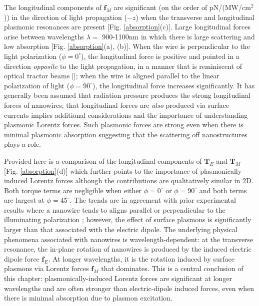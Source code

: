 The longitudinal components of $\mathbf{f}_M$ are significant (on the order of pN/(MW/cm$^2$)) in the direction of light propagation ($-z$) when the transverse and longitudinal plasmonic resonances are present [Fig. \ref{absorption}(c)]. Large longitudinal forces arise between wavelengths $\lambda=$ 900-1100nm in which there is large scattering and low absorption [Fig. \ref{absorption}(a), (b)].
When the wire is perpendicular to the light polarization ($\phi = 0^\circ$), the longitudinal force is positive and pointed in a direction {\it opposite} to the light propagation, in a manner that is reminiscent of optical tractor beams [\cite{Ruffner2012}]; when the wire is aligned parallel to the linear polarization of light ($\phi = 90^\circ$), the longitudinal force increases significantly. It has generally been assumed that radiation pressure produces the strong longitudinal forces of nanowires; that longitudinal forces are {\it also} produced via surface currents implies additional considerations and the importance of understanding plasmonic Lorentz forces.  Such plasmonic forces are strong even when there is minimal plasmonic absorption suggesting that the scattering off nanostructures plays a role.

Provided here is a comparison of the longitudinal components of $\mathbf{T}_E$ and $\mathbf{T}_M$ [Fig. \ref{absorption}(d)] which further points to the importance of plasmonically-induced Lorentz forces although the contributions are qualitatively similar in 2D.  Both torque terms are negligible when either $\phi = 0^\circ$ or $\phi = 90^\circ$ and both terms are largest at $\phi = 45^\circ$. The trends are in agreement with prior experimental results where a nanowire tends to aligns parallel or perpendicular to the illuminating polarization \cite{Tong}; however, the effect of surface plasmons is significantly larger than that associated with the electric dipole.  The underlying physical phenomena associated with nanowires is wavelength-dependent: at the transverse resonance, the in-plane rotation of nanowires is produced by the induced electric dipole force $\mathbf{f}_E$.  At longer wavelengths, it is the rotation induced by surface plasmons via Lorentz forces $\mathbf{f}_M$ that dominates.  This is a central conclusion of this chapter: plasmonically-induced Lorentz forces are significant at longer wavelengths and are often stronger than electric-dipole induced forces, even when there is minimal absorption due to plasmon excitation.

